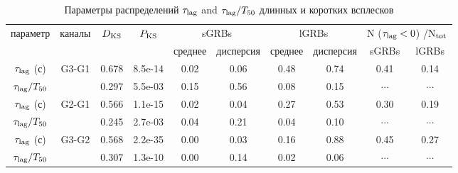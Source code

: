 \begin{table} [h]
 \centering
 \caption{Параметры распределений $\tau_{{\mathrm{lag}}}$ and $\tau_{{\mathrm{lag}}}/T_{50}$ 
 длинных и коротких всплесков}\label{tab:LagDist}
\scriptsize
  \begin{center}
  \begin{tabular}{c c c c c c c c c c}
  \hline
  \hline
параметр & каналы & $D_{\mathrm{KS}}$ &  $P_{\mathrm{KS}}$ 
&  \multicolumn{2}{c}{sGRBs} & \multicolumn{2}{c}{lGRBs} & \multicolumn{2}{c}{N ($\tau_{\mathrm{lag}}<0$) /N$_{\mathrm{tot}}$ }   \\
         &        &          &           
& среднее &  дисперсия   &  среднее &  дисперсия  & sGRBs & lGRBs \\
\hline
$\tau_{\mathrm{lag}}$ (с)    & G3-G1 &	0.678 &	8.5e-14 &	0.02 &	0.06 &	0.48 &	0.74 &	0.41     & 0.14\\
$\tau_{\mathrm{lag}}/T_{50}$ &	    &   0.297 & 5.5e-03	&   0.15 &	0.56 &	0.08 & 	0.15 &	$\cdots$ & $\cdots$    \\
$\tau_{\mathrm{lag}}$ (с)    & G2-G1 &   0.566 &	1.1e-15	&   0.02 &	0.04 &	0.27 &	0.53 &	0.30     & 0.19 \\
$\tau_{\mathrm{lag}}/T_{50}$ & 	    &   0.245 &	2.7e-03	&   0.04 &	0.21 &	0.04 &	0.10 &	$\cdots$ & $\cdots$	\\	
$\tau_{\mathrm{lag}}$ (с)    & G3-G2 &	0.568 & 2.2e-35	&   0.00 &	0.03 &	0.16 &	0.88 &	0.45     & 0.27 \\
$\tau_{\mathrm{lag}}/T_{50}$ &       &	0.307 & 1.3e-10	&   0.00 &	0.14 &	0.02 &	0.06 &	$\cdots$ & $\cdots$ \\
\hline
\end{tabular}
\end{center}
\end{table}